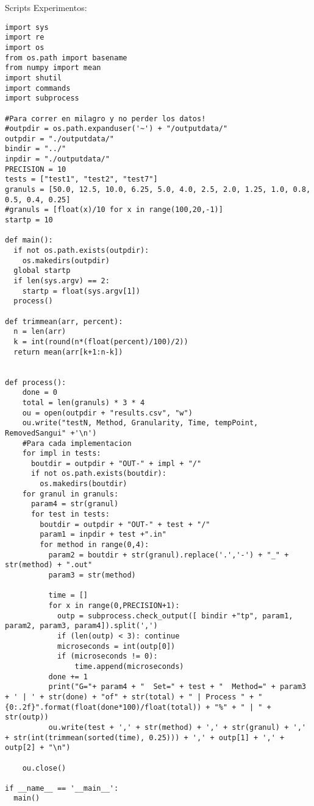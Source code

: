 \documentclass[a4paper]{article}
\begin{document}
Scripts Experimentos:
\begin{lstlisting}
import sys
import re
import os
from os.path import basename
from numpy import mean
import shutil
import commands
import subprocess

#Para correr en milagro y no perder los datos!
#outpdir = os.path.expanduser('~') + "/outputdata/"
outpdir = "./outputdata/"
bindir = "../"
inpdir = "./outputdata/"
PRECISION = 10
tests = ["test1", "test2", "test7"]
granuls = [50.0, 12.5, 10.0, 6.25, 5.0, 4.0, 2.5, 2.0, 1.25, 1.0, 0.8, 0.5, 0.4, 0.25]
#granuls = [float(x)/10 for x in range(100,20,-1)]
startp = 10

def main():
  if not os.path.exists(outpdir):
    os.makedirs(outpdir)
  global startp
  if len(sys.argv) == 2:
    startp = float(sys.argv[1])
  process()

def trimmean(arr, percent):
  n = len(arr)
  k = int(round(n*(float(percent)/100)/2))
  return mean(arr[k+1:n-k])


def process():
    done = 0
    total = len(granuls) * 3 * 4
    ou = open(outpdir + "results.csv", "w")
    ou.write("testN, Method, Granularity, Time, tempPoint, RemovedSangui" +'\n')
    #Para cada implementacion
    for impl in tests:
      boutdir = outpdir + "OUT-" + impl + "/"
      if not os.path.exists(boutdir):
        os.makedirs(boutdir)
    for granul in granuls:
      param4 = str(granul)
      for test in tests:
        boutdir = outpdir + "OUT-" + test + "/" 
        param1 = inpdir + test +".in"
        for method in range(0,4):
          param2 = boutdir + str(granul).replace('.','-') + "_" + str(method) + ".out"
          param3 = str(method)
          
          time = []
          for x in range(0,PRECISION+1):
            outp = subprocess.check_output([ bindir +"tp", param1, param2, param3, param4]).split(',')
            if (len(outp) < 3): continue
            microseconds = int(outp[0])
            if (microseconds != 0):
                time.append(microseconds)
          done += 1
          print("G="+ param4 + "  Set=" + test + "  Method=" + param3 + ' | ' + str(done) + "of" + str(total) + " | Process " + "{0:.2f}".format(float(done*100)/float(total)) + "%" + " | " + str(outp))
          ou.write(test + ',' + str(method) + ',' + str(granul) + ',' + str(int(trimmean(sorted(time), 0.25))) + ',' + outp[1] + ',' + outp[2] + "\n")

    ou.close()

if __name__ == '__main__':
  main()
\end{lstlisting}
\end{document}
